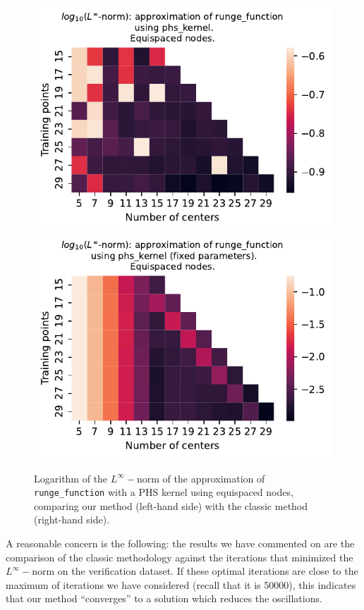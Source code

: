 \documentclass[12pt]{report} %
\begin{document}
\begin{figure}[ht]
  \centering
  \includegraphics[width=.49\textwidth]{imagenes/experiments/1d/variational/runge_function-Kphs_kernel-Equi.pdf}
  \includegraphics[width=.49\textwidth]{imagenes/experiments/1d/least_squares/opt-runge_function-Kphs_kernel-Equi.pdf}
  \caption{Logarithm of the $L^\infty-$norm of the approximation of \texttt{runge\_function} with a PHS kernel using equispaced nodes, comparing our method (left-hand side) with the classic method (right-hand side).}
  \label{fig:runge-function-phs-kernel-equi-comparison-methods}
\end{figure}


A reasonable concern is the following: the results we have commented on are the comparison of the classic methodology against the iterations that minimized the $L^\infty-$norm on the verification dataset. If these optimal iterations are close to the maximum of iterations we have considered (recall that it is 50000), this indicates that our method ``converges'' to a solution which reduces the oscillations.%
\end{document}
